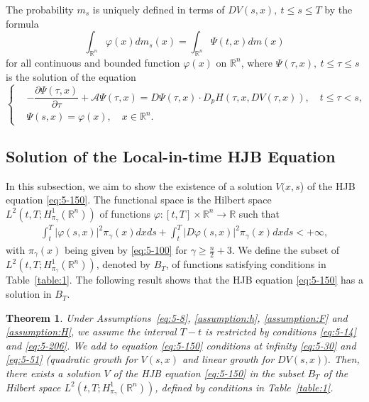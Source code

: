 \documentclass[11pt]{article}
\numberwithin{equation}{section}
\newtheorem{theorem}{Theorem}[section]
\newcommand{\br}{\mathbb{R}}
\newcommand{\brn}{{\mathbb{R}^n}}
\newcommand{\1}{\mbox{1\hspace{-1mm}I}}
\begin{document}
The probability $m_s$ is uniquely defined in terms of $DV(s,x),\ t\le s\le T$ by the formula 
\begin{equation}\label{eq:5-114}
    \int_{\brn}\varphi(x)dm_s(x)=\int_{\brn}\Psi(t,x)dm(x)
\end{equation}
for all continuous and bounded  function $\varphi(x)$ on $\brn$, where $\Psi(\tau,x),\ t\le\tau\le s$ is the solution of the equation 
\begin{equation}\label{eq:5-115}
\left\{
\begin{aligned}
    &-\dfrac{\partial\Psi(\tau,x)}{\partial\tau}+\mathcal{A}\Psi(\tau,x)=D\Psi(\tau,x)\cdot D_{p}H(\tau,x,DV(\tau,x)),\quad t\le \tau<s,\\
    &\Psi(s,x)=\varphi(x),\quad x\in\brn.
\end{aligned}
\right.
\end{equation}

\subsection{Solution of the Local-in-time HJB Equation}\label{subsec:main}

In this subsection, we aim to show the existence of a solution $V(x,s$) of the HJB equation \eqref{eq:5-150}. 
The functional space is the Hilbert space $L^{2}\left(t,T;H_{\pi_{\gamma}}^{1}(\brn)\right)$ of functions $\varphi:[t,T]\times\brn\to \br$ such that 
\begin{align*}
    \int_{t}^{T}|\varphi(s,x)|^{2}\pi_{\gamma}(x)dxds+\int_{t}^{T}|D\varphi(s,x)|^{2}\pi_{\gamma}(x)dxds<+\infty,
\end{align*}
with $\pi_{\gamma}(x)$ being given by \eqref{eq:5-100} for $\gamma\geq\frac{n}{2}+3$. We define the subset of $L^{2}(t,T;H_{\pi_{\gamma}}^{1}(\brn))$, denoted by $B_{T}$, of functions satisfying conditions in Table~\ref{table:1}. The following result shows that the HJB equation \eqref{eq:5-150} has a solution in $B_{T}$. 

\begin{theorem}\label{theo5-2} 
Under Assumptions~\ref{eq:5-8}, \ref{assumption:h}, \ref{assumption:F} and \ref{assumption:H}, we assume the interval $T-t$ is restricted by conditions \eqref{eq:5-14} and \eqref{eq:5-206}. We add to equation \eqref{eq:5-150} conditions at infinity \eqref{eq:5-30} and \eqref{eq:5-51} (quadratic growth for $V(s,x)$ and linear growth for $DV(s,x))$. Then, there exists a solution $V$ of the HJB equation \eqref{eq:5-150} in the subset $B_{T}$ of the Hilbert space $L^{2}\left(t,T;H_{\pi_{\gamma}}^{1}(\brn)\right)$,
defined by conditions in Table~\ref{table:1}. 
\end{theorem}
\end{document}
